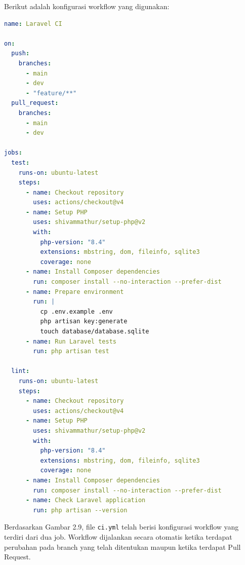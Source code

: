 Berikut adalah konfigurasi workflow yang digunakan:

\begin{lstlisting}[language=yaml]
name: Laravel CI

on:
  push:
    branches:
      - main
      - dev
      - "feature/**"
  pull_request:
    branches:
      - main
      - dev

jobs:
  test:
    runs-on: ubuntu-latest
    steps:
      - name: Checkout repository
        uses: actions/checkout@v4
      - name: Setup PHP
        uses: shivammathur/setup-php@v2
        with:
          php-version: "8.4"
          extensions: mbstring, dom, fileinfo, sqlite3
          coverage: none
      - name: Install Composer dependencies
        run: composer install --no-interaction --prefer-dist
      - name: Prepare environment
        run: |
          cp .env.example .env
          php artisan key:generate
          touch database/database.sqlite
      - name: Run Laravel tests
        run: php artisan test

  lint:
    runs-on: ubuntu-latest
    steps:
      - name: Checkout repository
        uses: actions/checkout@v4
      - name: Setup PHP
        uses: shivammathur/setup-php@v2
        with:
          php-version: "8.4"
          extensions: mbstring, dom, fileinfo, sqlite3
          coverage: none
      - name: Install Composer dependencies
        run: composer install --no-interaction --prefer-dist
      - name: Check Laravel application
        run: php artisan --version
\end{lstlisting}


Berdasarkan Gambar 2.9, file \texttt{ci.yml} telah berisi konfigurasi workflow yang terdiri dari dua job. Workflow dijalankan secara otomatis ketika terdapat perubahan pada branch yang telah ditentukan maupun ketika terdapat Pull Request.


